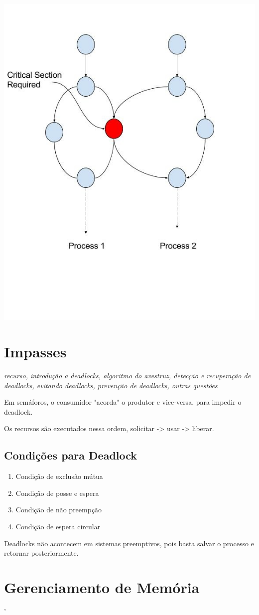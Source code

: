 \documentclass[ ]{article}
\begin{document}
		\includegraphics[scale=0.8]{images/critical_section.jpg}
	\section{Impasses}
		\textit{recurso, introdução a deadlocks, algoritmo do avestruz, detecção e recuperação de deadlocks, evitando deadlocks, prevenção de deadlocks, outras questões}
		
		Em semáforos, o consumidor "acorda" o produtor e vice-versa, para impedir o deadlock.	
		
		Os recursos são executados nessa ordem, solicitar -> usar -> liberar.
		\subsection{Condições para Deadlock}
		\begin{enumerate}
			\item Condição de exclusão mútua
			\item Condição de posse e espera
			\item Condição de não preempção
			\item Condição de espera circular
		\end{enumerate}
		Deadlocks não acontecem em sistemas preemptivos, pois basta salvar o processo e retornar posteriormente.
	\section{Gerenciamento de Memória}'
\end{document}
